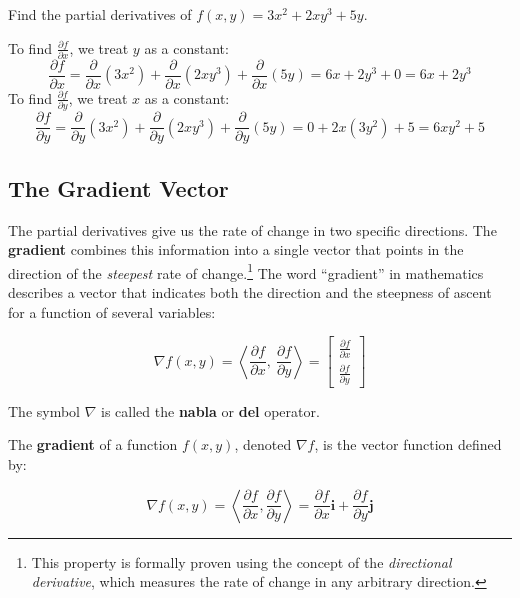 \begin{example}
    Find the partial derivatives of \( f(x, y) = 3x^2 + 2xy^3 + 5y \).
\end{example}

\begin{solution}
    
To find \( \frac{\partial f}{\partial x} \), we treat \( y \) as a constant:
\[
\frac{\partial f}{\partial x} = \frac{\partial}{\partial x}(3x^2) + \frac{\partial}{\partial x}(2xy^3) + \frac{\partial}{\partial x}(5y) = 6x + 2y^3 + 0 = 6x + 2y^3
\]
To find \( \frac{\partial f}{\partial y} \), we treat \( x \) as a constant:
\[
\frac{\partial f}{\partial y} = \frac{\partial}{\partial y}(3x^2) + \frac{\partial}{\partial y}(2xy^3) + \frac{\partial}{\partial y}(5y) = 0 + 2x(3y^2) + 5 = 6xy^2 + 5
\]
\end{solution}

\subsection*{The Gradient Vector}

The partial derivatives give us the rate of change in two specific directions. The \textbf{gradient} combines this information into a single vector that points in the direction of the \emph{steepest} rate of change.\footnote{This property is formally proven using the concept of the \textit{directional derivative}, which measures the rate of change in any arbitrary direction.} The word ``gradient'' in mathematics describes a vector that indicates both the direction and the steepness of ascent for a function of several variables:

$$
\nabla f(x, y) = \left\langle \frac{\partial f}{\partial x},\ \frac{\partial f}{\partial y} \right\rangle
= 
\begin{bmatrix}
    \frac{\partial f}{\partial x} \\
    \frac{\partial f}{\partial y}
\end{bmatrix}
$$

The symbol $\nabla$ is called the \textbf{nabla} or \textbf{del} operator.

\begin{definition}
The \textbf{gradient} of a function \( f(x, y) \), denoted \( \nabla f \), is the vector function defined by:

$$
\nabla f(x, y) = \left\langle \frac{\partial f}{\partial x}, \frac{\partial f}{\partial y} \right\rangle = \frac{\partial f}{\partial x} \mathbf{i} + \frac{\partial f}{\partial y} \mathbf{j}
$$

\end{definition}

